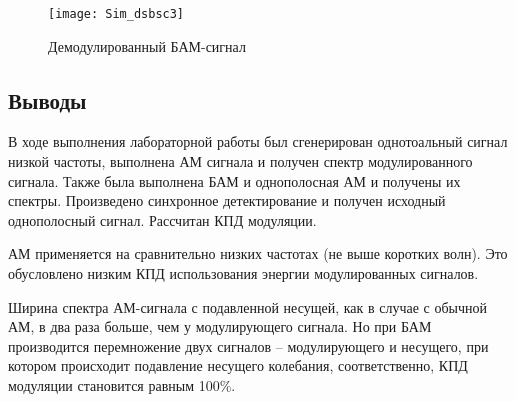 \documentclass[10pt,a4paper]{article}
\begin{document}
\begin{figure}[h]\centering
	\texttt{[image: Sim\_dsbsc3]}
	\caption{Демодулированный БАМ-сигнал}\label{fig.Sim_dsbsc3}
\end{figure}                                                                                                                                                                                                                                                                                                                                                                                                                                                                                                                                                                                                                                                                                                                                                                                                                                                                                                                                                                                                                                                                                                                                                                                                                                                                                                                                                                                                                                                                        

\FloatBarrier

\subsection{Выводы}
В ходе выполнения лабораторной работы был сгенерирован однотоальный сигнал низкой частоты, выполнена АМ сигнала и получен спектр модулированного сигнала. Также была выполнена БАМ и однополосная АМ и получены их спектры. Произведено синхронное детектирование и получен исходный однополосный сигнал. Рассчитан КПД модуляции.

АМ применяется на сравнительно низких частотах (не выше коротких волн). Это обусловлено низким КПД использования энергии модулированных сигналов.

Ширина спектра АМ-сигнала с подавленной несущей, как  в случае с обычной АМ, в два раза больше, чем у модулирующего сигнала. Но при БАМ производится перемножение двух сигналов – модулирующего и несущего, при котором происходит подавление несущего колебания, соответственно, КПД модуляции становится равным 100\%. 
\end{document}
